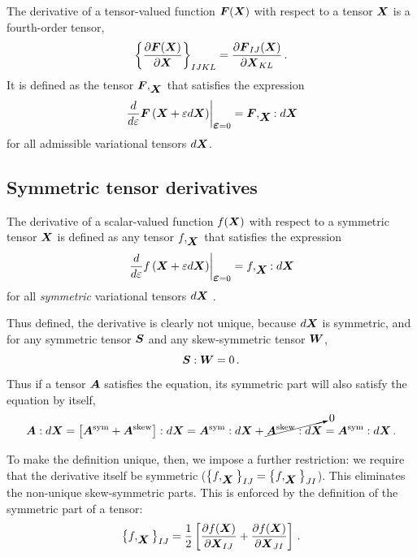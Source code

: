 \documentclass[10pt,letterpaper,oneside]{report}
\newcommand{\ten}[1]{\mbox{\boldmath $#1$}{}}
\newcommand{\scas}[1]{\mbox{{\scriptsize{${\rm{#1}}$}}}{}}
\begin{document}
The derivative of a tensor-valued function $ \ten{F} ( \ten{X} )$ with respect to a tensor $\ten{X}$ is a fourth-order tensor, 
\begin{equation}
\left\lbrace \frac{\partial \ten{F} ( \ten{X} ) }{\partial \ten{X}} \right\rbrace_{IJKL} = \frac{\partial \ten{F}_{IJ} ( \ten{X} ) }{\partial \ten{X}_{KL}} \, .
\end{equation}
It is defined as the tensor $\ten{F},_{\ten{X}}$ that satisfies the expression
\begin{equation}
\left. \frac{d}{d \varepsilon} \ten{F} \left( \ten{X} + \varepsilon d\ten{X} \right) \right|_{\ten{\varepsilon}=0} = \ten{F},_{\ten{X}} : d \ten{X}
\end{equation}
for all admissible variational tensors $d \ten{X}$. 

\subsection{Symmetric tensor derivatives}
The derivative of a scalar-valued function $f ( \ten{X} )$ with respect to a symmetric tensor $\ten{X}$ is defined as any tensor $f,_{\ten{X}}$ that satisfies the expression
\begin{equation}
\left. \frac{d}{d \varepsilon} f \left( \ten{X} + \varepsilon d\ten{X} \right) \right|_{\ten{\varepsilon}=0} = f,_{\ten{X}} : d \ten{X}
\end{equation}
for all \textit{symmetric} variational tensors $d \ten{X}$ \autocite{Lebedev}.

Thus defined, the derivative is clearly not unique, because $d \ten{X}$ is symmetric, and for any symmetric tensor $\ten{S}$ and any skew-symmetric tensor $\ten{W}$,
\begin{equation}
\ten{S} : \ten{W} = 0 \, .
\end{equation}
Thus if a tensor $\ten{A}$ satisfies the equation, its symmetric part will also satisfy the equation by itself, 
\begin{equation}
\ten{A} : d \ten{X} = \left[ \ten{A}^{\scas{sym}} + \ten{A}^{\scas{skew}} \right] : d \ten{X} = \ten{A}^{\scas{sym}} : d \ten{X} + \cancelto{0}{ \ten{A}^{\scas{skew}} : d \ten{X} } = \ten{A}^{\scas{sym}} : d \ten{X} \, .
\end{equation}

To make the definition unique, then, we impose a further restriction: we require that the derivative itself be symmetric ($\left\lbrace f,_{\ten{X}} \right\rbrace_{IJ} = \left\lbrace f,_{\ten{X}} \right\rbrace_{JI} $).  This eliminates the non-unique skew-symmetric parts.  This is enforced by the definition of the symmetric part of a tensor:
\begin{equation}
\left\lbrace f,_{\ten{X}} \right\rbrace_{IJ} = \frac{1}{2} \left[ \frac{\partial f ( \ten{X} ) }{\partial \ten{X}_{IJ}} + \frac{\partial f ( \ten{X} ) }{\partial \ten{X}_{JI}} \right] \, .
\end{equation}
\end{document}
